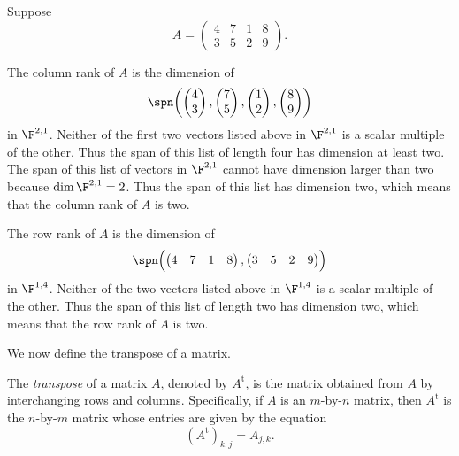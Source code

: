 \begin{example}\label{ax:3.53}
Suppose
\[ A = \begin{pmatrix} 4 & 7 & 1 & 8\\ 3 & 5 & 2 & 9 \end{pmatrix}. \]

The column rank of $A$ is the dimension of
\[ \spn\biggl(\begin{pmatrix} 4\\ 3 \end{pmatrix},
   \begin{pmatrix} 7\\ 5 \end{pmatrix},
   \begin{pmatrix} 1\\ 2 \end{pmatrix},
   \begin{pmatrix} 8\\ 9 \end{pmatrix}\biggr) \]
in $\F^{2,1}$. Neither of the first two vectors listed above in $\F^{2,1}$ is a
scalar multiple of the other. Thus the span of this list of length four has
dimension at least two. The span of this list of vectors in $\F^{2,1}$ cannot
have dimension larger than two because $\dim\F^{2,1}=2$. Thus the span of this
list has dimension two, which means that the column rank of $A$ is two.

The row rank of $A$ is the dimension of
\[ \spn\Bigl(\begin{pmatrix} 4 & 7 & 1 & 8 \end{pmatrix},
   \begin{pmatrix} 3 & 5 & 2 & 9 \end{pmatrix}\Bigr) \]
in $\F^{1,4}$. Neither of the two vectors listed above in $\F^{1,4}$ is a
scalar multiple of the other. Thus the span of this list of length two has
dimension two, which means that the row rank of $A$ is two.
\end{example}

We now define the transpose of a matrix.

\begin{definition}\label{ax:3.54}
The \emph{transpose} of a matrix $A$, denoted by $A^{\mathrm{t}}$, is the
matrix obtained from $A$ by interchanging rows and columns. Specifically, if
$A$ is an $m$-by-$n$ matrix, then $A^{\mathrm{t}}$ is the $n$-by-$m$ matrix
whose entries are given by the equation
\[ (A^{\mathrm{t}})_{k,j} = A_{j,k}. \]
\end{definition}

